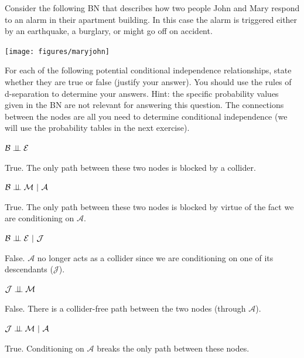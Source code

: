 \documentclass[assignment02_Solutions]{subfiles}
\begin{document}
\begin{exercise}[(15 minutes)]

Consider the following BN that describes how two people John and Mary respond to an alarm in their apartment building.  In this case the alarm is triggered either by an earthquake, a burglary, or might go off on accident.
\vspace{1em}
\begin{center}
\texttt{[image: figures/maryjohn]}
\end{center}

For each of the following potential conditional independence relationships, state whether they are true or false (justify your answer).  You should use the rules of d-separation to determine your answers.  Hint: the specific probability values given in the BN are not relevant for answering this question.  The connections between the nodes are all you need to determine conditional independence (we will use the probability tables in the next exercise).

\bes
\item $\mathcal{B} \perp\!\!\!\perp \mathcal{E}$
\begin{boxedsolution}
True. The only path between these two nodes is blocked by a collider.
\end{boxedsolution}
\item $\mathcal{B} \perp\!\!\!\perp \mathcal{M}~|~\mathcal{A}$
\begin{boxedsolution}
True. The only path between these two nodes is blocked by virtue of the fact we are conditioning on $\mathcal{A}$.
\end{boxedsolution}
\item $\mathcal{B} \perp\!\!\!\perp \mathcal{E}~|~\mathcal{J}$
\begin{boxedsolution}
False. $\mathcal{A}$ no longer acts as a collider since we are conditioning on one of its descendants ($\mathcal{J}$).
\end{boxedsolution}
\item $\mathcal{J} \perp\!\!\!\perp \mathcal{M}$
\begin{boxedsolution}
False. There is a collider-free path between the two nodes (through $\mathcal{A}$).
\end{boxedsolution}
\item $\mathcal{J} \perp\!\!\!\perp \mathcal{M}~|~\mathcal{A}$
\begin{boxedsolution}
True. Conditioning on $\mathcal{A}$ breaks the only path between these nodes.
\end{boxedsolution}
\ees
\end{exercise}
\end{document}
